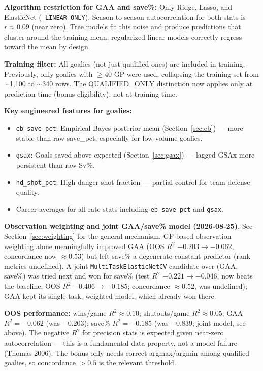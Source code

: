 \documentclass[11pt, a4paper]{article}
\begin{document}
\textbf{Algorithm restriction for GAA and save\%:} Only Ridge, Lasso, and ElasticNet
(\texttt{\_LINEAR\_ONLY}). Season-to-season autocorrelation for both stats is $r \approx 0.09$
(near zero). Tree models fit this noise and produce predictions that cluster around the training
mean; regularized linear models correctly regress toward the mean by design.

\textbf{Training filter:} All goalies (not just qualified ones) are included in training.
Previously, only goalies with $\geq 40$ GP were used, collapsing the training set from
$\sim$1{,}100 to $\sim$340 rows. The QUALIFIED\_ONLY distinction now applies only at prediction
time (bonus eligibility), not at training time.

\textbf{Key engineered features for goalies:}
\begin{itemize}[leftmargin=*]
  \item \texttt{eb\_save\_pct}: Empirical Bayes posterior mean (Section~\ref{sec:eb}) — more
        stable than raw save\_pct, especially for low-volume goalies.
  \item \texttt{gsax}: Goals saved above expected (Section~\ref{sec:gsax}) — lagged GSAx
        more persistent than raw Sv\%.
  \item \texttt{hd\_shot\_pct}: High-danger shot fraction — partial control for team defense quality.
  \item Career averages for all rate stats including \texttt{eb\_save\_pct} and \texttt{gsax}.
\end{itemize}

\textbf{Observation weighting and joint GAA/save\% model (2026-08-25).} See
Section~\ref{sec:weighting} for the general mechanism. GP-based observation weighting alone
meaningfully improved GAA (OOS $R^2$ $-0.203 \to -0.062$, concordance now $\approx 0.53$) but
left save\% a degenerate constant predictor (rank metrics undefined). A joint
\texttt{MultiTaskElasticNetCV} candidate over (GAA, save\%) was tried next and won for save\%
(test $R^2$ $-0.221 \to -0.046$, now beats the baseline; OOS $R^2$ $-0.406 \to -0.185$;
concordance $\approx 0.52$, was undefined); GAA kept its single-task, weighted model, which
already won there.

\textbf{OOS performance:} wins/game $R^2 \approx 0.10$; shutouts/game $R^2 \approx 0.05$;
GAA $R^2 = -0.062$ (was $-0.203$); save\% $R^2 = -0.185$ (was $-0.839$; joint model, see above).
The negative $R^2$ for precision stats is expected given near-zero autocorrelation — this is a
fundamental data property, not a model failure (Thomas 2006). The bonus only needs correct
argmax/argmin among qualified goalies, so concordance $> 0.5$ is the relevant threshold.
\end{document}
